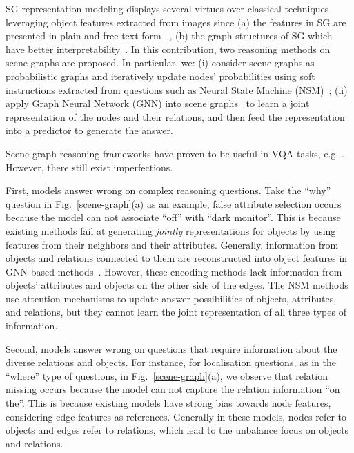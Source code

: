 \documentclass[letterpaper]{article} %
\begin{document}
SG representation modeling displays several virtues over classical techniques leveraging object features extracted from images since (a) the features in SG are presented in plain and free text form ~\cite{DBLP:journals/corr/abs-2101-05479}, (b) the graph structures of SG which have better interpretability~\cite{DBLP:conf/bmvc/ZhangCX19}.
In this contribution, two reasoning methods on scene graphs are proposed. In particular, we: (i) consider scene graphs as probabilistic graphs and iteratively update nodes' probabilities using soft instructions extracted from questions such as Neural State Machine (NSM)~\cite{DBLP:conf/nips/HudsonM19,DBLP:conf/ijcnn/LeLV020}; (ii) apply Graph Neural Network (GNN) into scene graphs~\cite{inproceedings,DBLP:conf/iccv/LiGCL19} to learn a joint representation of the nodes and their relations, and then feed the representation into a predictor to generate the answer. 

Scene graph reasoning frameworks have proven to be useful in VQA tasks, e.g. \cite{johnson2015image,yang2020prior}. However, there still exist imperfections.

First, models answer wrong on complex reasoning questions. Take the ``why'' question in Fig.~\ref{scene-graph}(a) as an example, false attribute selection occurs because the model can not associate ``off'' with ``dark monitor''.
This is because existing methods fail at generating \emph{jointly} representations for objects by using features from their neighbors and their attributes. 
Generally, information from objects and relations connected to them are reconstructed into object features in GNN-based methods~\cite{xu2019spatial}. However, these encoding methods lack information from objects' attributes and objects on the other side of the edges. 
The NSM methods use attention mechanisms to update answer possibilities of objects, attributes, and relations, but they cannot learn the joint representation of all three types of information. 

Second, models answer wrong on questions that require information about the diverse relations and objects. For instance, for localisation questions, as in the ``where'' type of questions, in Fig.~\ref{scene-graph}(a), we observe that relation missing occurs because the model can not capture the relation information ``on the''. This is because existing models have strong bias towards node features, considering edge features as references. Generally in these models, nodes refer to objects and edges refer to relations, which lead to the unbalance focus on objects and relations. 
\end{document}
